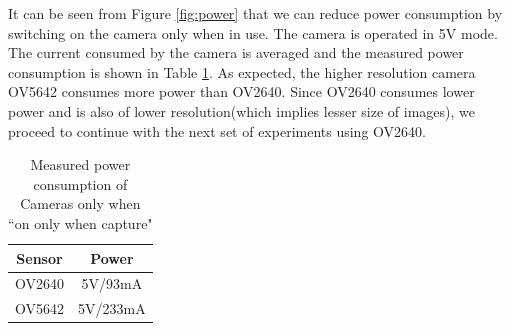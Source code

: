 It can be seen from Figure \ref{fig:power} that we can reduce power consumption by switching on the camera only when in use. The camera is operated in 5V mode. The current consumed by the camera is averaged and the measured power consumption is shown in Table \ref{tbl:power_cons}. As expected, the higher resolution camera OV5642 consumes more power than OV2640. Since OV2640 consumes lower power and is also of lower resolution(which implies lesser size of images), we proceed to continue with the next set of experiments using OV2640.
\begin{table}[ht]
\centering
\caption{Measured power consumption of Cameras only when ``on only when capture"}
\label{tbl:power_cons}
\begin{tabular}{|c|c|}
\hline
Sensor & Power \\
\hline
 OV2640 & 5V/93mA\\
 \hline
 OV5642 & 5V/233mA\\
 \hline
\end{tabular}
\end{table}
\nopagebreak
\nolinebreak